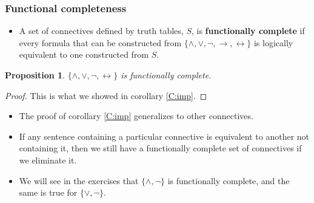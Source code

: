 \documentclass[handout]{beamer}
\newtheorem{proposition}[theorem]{Proposition}{\bfseries}{\itshape}
\begin{document}
\begin{frame}
\frametitle{Functional completeness}
\begin{itemize}
\item A set of connectives defined by truth tables, $S$, is \textbf{functionally complete} if every formula that can be constructed from $\{\wedge,\vee,\neg,\rightarrow,\leftrightarrow\}$ is logically equivalent to one constructed from $S$. 
\end{itemize}

\begin{proposition}
$\{\wedge,\vee,\neg,\leftrightarrow\}$ is functionally complete.
\end{proposition}
\begin{proof}
This is what we showed in corollary \ref{C:imp}.
\end{proof}
\begin{itemize}
\item The proof of corollary \ref{C:imp} generalizes to other connectives. 
\item If any sentence containing a particular connective is equivalent to another not containing it, then we still have a functionally complete set of connectives if we eliminate it. 
\item We will see in the exercises that $\{\wedge, \neg\}$ is functionally complete, and the same is true for $\{\vee,\neg\}$. 
\end{itemize}
\end{frame}
\end{document}
